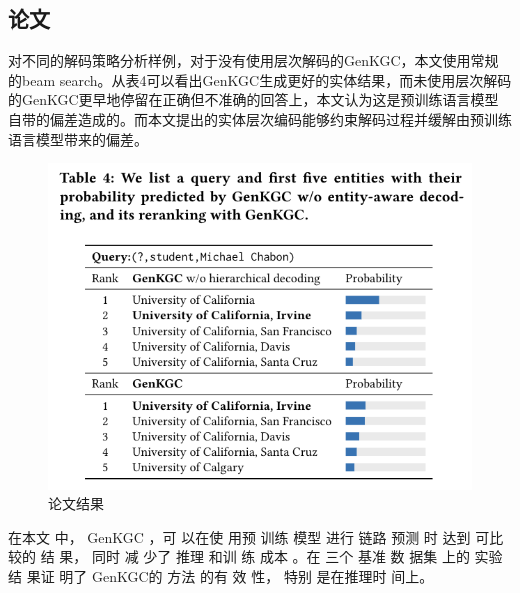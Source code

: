 \documentclass{article}
\begin{document}
\newpage

\subsection{论文}
对不同的解码策略分析样例，对于没有使用层次解码的GenKGC，本文使用常规的beam search。从表4可以看出GenKGC生成更好的实体结果，而未使用层次解码的GenKGC更早地停留在正确但不准确的回答上，本文认为这是预训练语言模型自带的偏差造成的。而本文提出的实体层次编码能够约束解码过程并缓解由预训练语言模型带来的偏差。


\begin{figure}[htp]
        \centering
        \includegraphics[width=16cm]{结果.png}
        \caption{论文结果}
        \label{pic7}    
    \end{figure} 

\par 在本文 中， GenKGC ，可 以在使 用预 训练 模型 进行
链路 预测 时 达到 可比 较的 结 果， 同时 减 少了 推理 和训 练 成本 。在
三个 基准 数 据集 上的 实验 结 果证 明了 GenKGC的 方法 的有 效 性， 特别
是在推理时 间上。
\end{document}
